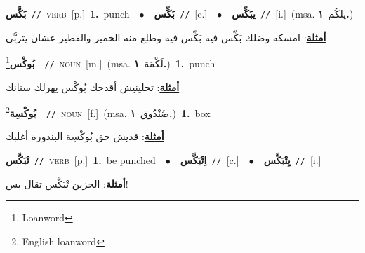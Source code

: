 \documentclass[10pt,a4paper,twoside]{article} %
\begin{document}
\begin{multicols}{2}
{\setlength\topsep{0pt}\textbf{\foreignlanguage{arabic}{بَكَّس}}\ {\color{gray}\texttt{//}\color{black}}\ \textsc{verb}\ [p.]\ \textbf{1.}~punch\ \ $\bullet$\ \ \setlength\topsep{0pt}\textbf{\foreignlanguage{arabic}{بَكِّس}}\ {\color{gray}\texttt{//}\color{black}}\ [c.]\ \ $\bullet$\ \ \setlength\topsep{0pt}\textbf{\foreignlanguage{arabic}{يبَكِّس}}\ {\color{gray}\texttt{//}\color{black}}\ [i.]\ \color{gray}(msa. \foreignlanguage{arabic}{يلكُم}~\foreignlanguage{arabic}{\textbf{١.}})\color{black}\  \begin{flushright}\color{gray}\foreignlanguage{arabic}{\textbf{\underline{\foreignlanguage{arabic}{أمثلة}}}: امسكه وضلك بَكِّس فيه بَكِّس فيه وطلع منه الخمير والفطير عشان يتربَّى}\end{flushright}\color{black}} \vspace{2mm}

{\setlength\topsep{0pt}\textbf{\foreignlanguage{arabic}{بُوكْس}}\footnote{Loanword}\ \ {\color{gray}\texttt{//}\color{black}}\ \textsc{noun}\ [m.]\ \color{gray}(msa. \foreignlanguage{arabic}{لَكْمَة}~\foreignlanguage{arabic}{\textbf{١.}})\color{black}\ \textbf{1.}~punch\  \begin{flushright}\color{gray}\foreignlanguage{arabic}{\textbf{\underline{\foreignlanguage{arabic}{أمثلة}}}: تخلينيش أقدحك بُوكْس يهرلك سنانك}\end{flushright}\color{black}} \vspace{2mm}

{\setlength\topsep{0pt}\textbf{\foreignlanguage{arabic}{بُوكْسِة}}\footnote{English loanword}\ \ {\color{gray}\texttt{//}\color{black}}\ \textsc{noun}\ [f.]\ \color{gray}(msa. \foreignlanguage{arabic}{صُنْدُوق}~\foreignlanguage{arabic}{\textbf{١.}})\color{black}\ \textbf{1.}~box\  \begin{flushright}\color{gray}\foreignlanguage{arabic}{\textbf{\underline{\foreignlanguage{arabic}{أمثلة}}}: قديش حق بُوكْسِة البندورة أغلبك}\end{flushright}\color{black}} \vspace{2mm}

{\setlength\topsep{0pt}\textbf{\foreignlanguage{arabic}{تْبَكَّس}}\ {\color{gray}\texttt{//}\color{black}}\ \textsc{verb}\ [p.]\ \textbf{1.}~be punched\ \ $\bullet$\ \ \setlength\topsep{0pt}\textbf{\foreignlanguage{arabic}{اِتْبَكَّس}}\ {\color{gray}\texttt{//}\color{black}}\ [c.]\ \ $\bullet$\ \ \setlength\topsep{0pt}\textbf{\foreignlanguage{arabic}{يِتْبَكَّس}}\ {\color{gray}\texttt{//}\color{black}}\ [i.]\  \begin{flushright}\color{gray}\foreignlanguage{arabic}{\textbf{\underline{\foreignlanguage{arabic}{أمثلة}}}: الحزين تْبَكَّس تقال بس!}\end{flushright}\color{black}} \vspace{2mm}


\end{multicols}
\end{document}
